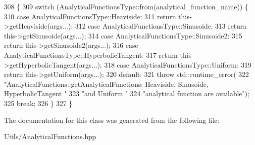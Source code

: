 \begin{DoxyCode}
308                                                                \{
309   \textcolor{keywordflow}{switch} (AnalyticalFunctionsType::from(analytical\_function\_name)) \{
310     \textcolor{keywordflow}{case} AnalyticalFunctionsType::Heaviside:
311       \textcolor{keywordflow}{return} this->getHeaviside(args...);
312     \textcolor{keywordflow}{case} AnalyticalFunctionsType::Sinusoide:
313       \textcolor{keywordflow}{return} this->getSinusoide(args...);
314     \textcolor{keywordflow}{case} AnalyticalFunctionsType::Sinusoide2:
315       \textcolor{keywordflow}{return} this->getSinusoide2(args...);
316     \textcolor{keywordflow}{case} AnalyticalFunctionsType::HyperbolicTangent:
317       \textcolor{keywordflow}{return} this->getHyperbolicTangent(args...);
318     \textcolor{keywordflow}{case} AnalyticalFunctionsType::Uniform:
319       \textcolor{keywordflow}{return} this->getUniform(args...);
320     \textcolor{keywordflow}{default}:
321       \textcolor{keywordflow}{throw} std::runtime\_error(
322           \textcolor{stringliteral}{"AnalyticalFunctions::getAnalyticalFunctions: Heaviside, Sinusoide, HyperbolicTangent "}
323           \textcolor{stringliteral}{"and Uniform "}
324           \textcolor{stringliteral}{"analytical function  are available"});
325       \textcolor{keywordflow}{break};
326   \}
327 \}
\end{DoxyCode}


The documentation for this class was generated from the following file\+:\begin{DoxyCompactItemize}
\item 
Utils/\+Analytical\+Functions.\+hpp\end{DoxyCompactItemize}
